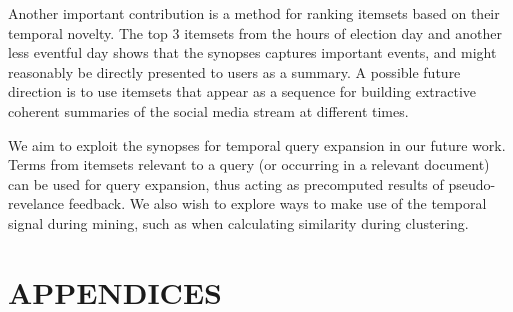 \documentclass[letterpaper,12pt,titlepage,oneside,final]{book}
\begin{document}
Another important contribution is a method for ranking itemsets based on their temporal novelty.
The top 3 itemsets from the hours of election day and another less eventful
day shows that the synopses captures important events, and might reasonably
be directly presented to users as a summary.
A possible future direction is to use itemsets that appear as a sequence for
building extractive coherent summaries of the social media stream at
different times.

We aim to exploit the synopses for temporal query expansion in our future work. Terms from itemsets relevant to a query (or occurring in a relevant document)
can be used for query expansion, thus acting as precomputed results of 
pseudo-revelance feedback.
We also wish to explore ways to make use of the temporal signal during mining,
such as when calculating similarity during clustering.

 
\appendix

\chapter*{APPENDICES}
\end{document}
